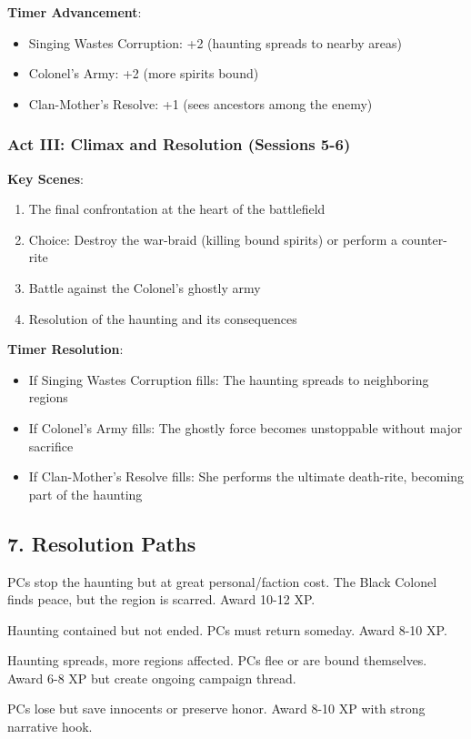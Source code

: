 \documentclass[11pt]{article}
\begin{document}
\textbf{Timer Advancement}:
\begin{itemize}[leftmargin=*]
\item Singing Wastes Corruption: +2 (haunting spreads to nearby areas)
\item Colonel's Army: +2 (more spirits bound)
\item Clan-Mother's Resolve: +1 (sees ancestors among the enemy)
\end{itemize}

\subsubsection*{Act III: Climax and Resolution (Sessions 5-6)}

\textbf{Key Scenes}:
\begin{enumerate}[leftmargin=*]
\item The final confrontation at the heart of the battlefield
\item Choice: Destroy the war-braid (killing bound spirits) or perform a counter-rite
\item Battle against the Colonel's ghostly army
\item Resolution of the haunting and its consequences
\end{enumerate}

\textbf{Timer Resolution}:
\begin{itemize}[leftmargin=*]
\item If Singing Wastes Corruption fills: The haunting spreads to neighboring regions
\item If Colonel's Army fills: The ghostly force becomes unstoppable without major sacrifice
\item If Clan-Mother's Resolve fills: She performs the ultimate death-rite, becoming part of the haunting
\end{itemize}

\subsection*{7. Resolution Paths}

\begin{description}[leftmargin=*]
\item[Victory (High Cost)] PCs stop the haunting but at great personal/faction cost. The Black Colonel finds peace, but the region is scarred. Award 10-12 XP.
\item[Compromise] Haunting contained but not ended. PCs must return someday. Award 8-10 XP.
\item[Failure] Haunting spreads, more regions affected. PCs flee or are bound themselves. Award 6-8 XP but create ongoing campaign thread.
\item[Noble Failure] PCs lose but save innocents or preserve honor. Award 8-10 XP with strong narrative hook.
\end{description}
\end{document}
